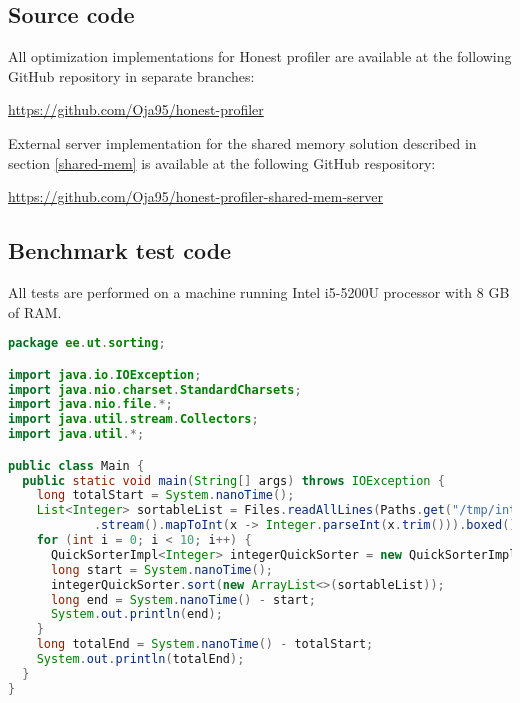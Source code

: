 \documentclass[..thesis.tex]{subfiles}
\begin{document}
\subsection{Source code}
\label{B:source-code}
All optimization implementations for Honest profiler are available at the following GitHub repository in separate branches:

\url{https://github.com/Oja95/honest-profiler}

External server implementation for the shared memory solution described in section \ref{shared-mem} is available at the following GitHub respository:

\url{https://github.com/Oja95/honest-profiler-shared-mem-server}

\subsection{Benchmark test code}
\label{B:benchmark-test-code}
All tests are performed on a machine running Intel i5-5200U processor with 8 GB of RAM.

\begin{lstlisting}[language=Java,style=def]
package ee.ut.sorting;

import java.io.IOException;
import java.nio.charset.StandardCharsets;
import java.nio.file.*;
import java.util.stream.Collectors;
import java.util.*;

public class Main {
  public static void main(String[] args) throws IOException {
    long totalStart = System.nanoTime();
    List<Integer> sortableList = Files.readAllLines(Paths.get("/tmp/integers.data"), StandardCharsets.UTF_8)
            .stream().mapToInt(x -> Integer.parseInt(x.trim())).boxed().collect(Collectors.toList());
    for (int i = 0; i < 10; i++) {
      QuickSorterImpl<Integer> integerQuickSorter = new QuickSorterImpl<>();
      long start = System.nanoTime();
      integerQuickSorter.sort(new ArrayList<>(sortableList));
      long end = System.nanoTime() - start;
      System.out.println(end);
    }
    long totalEnd = System.nanoTime() - totalStart;
    System.out.println(totalEnd);
  }
}

\end{lstlisting}

\newpage
\end{document}
